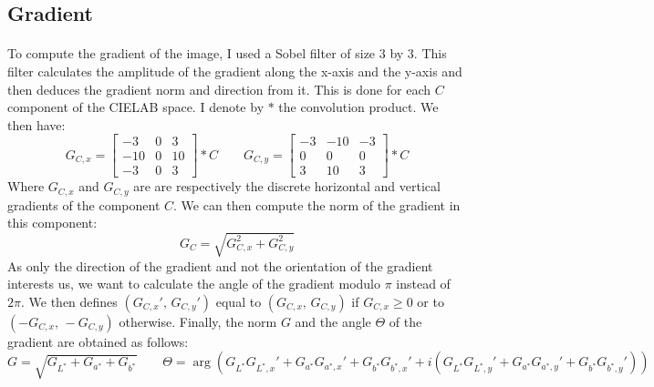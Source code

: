 \documentclass[11pt]{article}
\begin{document}
	\subsection{Gradient}
	
	\paragraph{}
	To compute the gradient of the image, I used a Sobel filter of size $3$ by $3$. This filter calculates the amplitude of the gradient along the x-axis and the y-axis and then deduces the gradient norm and direction from it. This is done for each $C$ component of the CIELAB space. I denote by $\ast$ the convolution product. We then have:
	$$ G_{C, x} = \begin{bmatrix} -3 & 0 & 3 \\ -10 & 0 & 10 \\ -3 & 0 & 3 \end{bmatrix} \ast C
		\qquad G_{C, y} = \begin{bmatrix} -3 & -10 & -3 \\ 0 & 0 & 0 \\ 3 & 10 & 3 \end{bmatrix} \ast C
	$$
	Where $G_{C, x}$ and $G_{C, y}$ are are respectively the discrete horizontal and vertical gradients of the component $C$. We can then compute the norm of the gradient in this component:
	$$ G_C = \sqrt{G_{C, x}^2 + G_{C, y}^2} $$
	As only the direction of the gradient and not the orientation of the gradient interests us, we want to calculate the angle of the gradient modulo $\pi$ instead of $2 \pi$. We then defines $(G_{C, x}', \, G_{C, y}')$ equal to $(G_{C, x}, \, G_{C, y})$ if $G_{C, x} \geqslant 0$ or to $(-G_{C, x}, \, -G_{C, y})$ otherwise. Finally, the norm $G$ and the angle $\Theta$ of the gradient are obtained as follows:
	$$ G = \sqrt{G_{L^*} + G_{a^*} + G_{b^*}} \qquad \Theta = \arg \left( G_{L^*} G_{L^*, x}' + G_{a^*} G_{a^*, x}' + G_{b^*} G_{b^*, x}' + i \left( G_{L^*} G_{L^*, y}' + G_{a^*} G_{a^*, y}' + G_{b^*} G_{b^*, y}' \right) \right)$$
	
\end{document}

